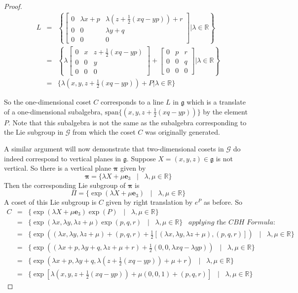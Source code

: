 \documentclass[honours]{UNSWthesis}
\newcommand{\R}{\mathbb{R}}
\newcommand{\G}{\mathcal{G}}
\newcommand{\g}{\mathfrak{g}}
\newcommand{\1}{\mathbf{e}_{1}}
\newcommand{\2}{\mathbf{e}_{3}}
\newcommand{\3}{\mathbf{e}_{3}}
\begin{document}
\begin{proof}
\begin{eqnarray*}
L &=& \left\lbrace
\begin{bmatrix}
0 & \lambda x + p & \lambda (z+\frac{1}{2}(xq-yp))+r \\
0 & 0 & \lambda y +q \\
0 & 0 & 0
\end{bmatrix}
\bigg| \lambda \in \R \right\rbrace \\
&=& \left\lbrace \lambda
\begin{bmatrix}
0 &  x & z+\frac{1}{2}(xq-yp) \\
0 & 0 & y \\
0 & 0 & 0
\end{bmatrix} +
\begin{bmatrix}
0 & p & r \\
0 & 0 & q \\
0 & 0 & 0
\end{bmatrix}
\bigg| \lambda \in \R \right\rbrace \\
&=& \{ \lambda (x,y,z+\frac{1}{2}(xq-yp))+P | \lambda \in \R \}
\end{eqnarray*}

So the one-dimensional coset $C$ corresponds to a line $L$ in $\g$ which is a translate of a one-dimensional subalgebra, $\text{span}\{(x,y,z+\frac{1}{2}(xq-yp))\}$ by the element $P$. Note that this subalgebra is not the same as the subalgebra corresponding to the Lie subgroup in $\G$ from which the coset $C$ was originally generated. 

A similar argument will now demonstrate that two-dimensional cosets in $\G$ do indeed correspond to vertical planes in $\g$.
Suppose $X=(x,y,z) \in \g$ is not vertical. So there is a vertical plane $\mathbf{\pi}$ given by 
\[
\mathbf{\pi} = \{\lambda X + \mu \3 \;\;\;|\;\;\; \lambda,\mu \in \R \}
\]
Then the corresponding Lie subgroup of $\mathbf{\pi}$ is 
\[
\Pi = \{\exp(\lambda X + \mu \3) \;\;\;|\;\;\; \lambda,\mu \in \R \}
\]
A coset of this Lie subgroup is $C$ given by right translation by $e^{P}$ as before. So 
\begin{eqnarray*}
C &=& \{\exp(\lambda X + \mu \3)\exp (P) \;\;\;|\;\;\; \lambda,\mu \in \R \} \\
&=& \{ \exp(\lambda x, \lambda y, \lambda z +\mu)\exp(p,q,r)\;\;\;|\;\;\; \lambda,\mu \in \R \} \;\;\;\textit{applying the CBH Formula:}\\
&=&  \{ \exp((\lambda x, \lambda y, \lambda z +\mu)+(p,q,r)+\frac{1}{2}[(\lambda x, \lambda y, \lambda z +\mu),(p,q,r)])\;\;\;|\;\;\; \lambda,\mu \in \R \} \\
&=& \{ \exp ((\lambda x+p, \lambda y+q, \lambda z +\mu +r)+ \frac{1}{2}(0,0,\lambda xq -\lambda yp))\;\;\;|\;\;\; \lambda,\mu \in \R \} \\
&=& \{ \exp (\lambda x+p, \lambda y+q, \lambda (z+\frac{1}{2}(xq-yp)) +\mu +r)\;\;\;|\;\;\; \lambda,\mu \in \R \} \\
&=& \{ \exp [\lambda( x, y, z+\frac{1}{2}(xq-yp))+\mu(0,0,1)+(p,q,r)]\;\;\;|\;\;\; \lambda,\mu \in \R \}
\end{eqnarray*}


\end{proof}
\end{document}
